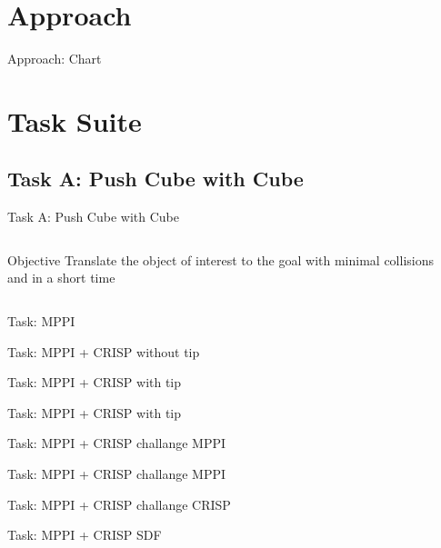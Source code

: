 \documentclass[10pt, aspectratio=169]{beamer}
\begin{document}
\section{Approach}
\begin{frame}{Approach: Chart}
\end{frame}

\section{Task Suite}
\subsection{Task A: Push Cube with Cube}
\begin{frame}{Task A: Push Cube with Cube}
  \begin{columns}[T]
    \begin{column}{0.6\textwidth}
      \begin{block}{Objective}
        Translate the object of interest to the goal with minimal collisions and in a short time
      \end{block}
    \end{column}

    \begin{column}{0.4\textwidth}
    \end{column}
  \end{columns}
\end{frame}
\begin{frame}{Task: MPPI}
\end{frame}
\begin{frame}{Task: MPPI + CRISP without tip}
\end{frame}
\begin{frame}{Task: MPPI + CRISP with tip}
\end{frame}
\begin{frame}{Task: MPPI + CRISP with tip}
\end{frame}
\begin{frame}{Task: MPPI + CRISP challange MPPI}
\end{frame}
\begin{frame}{Task: MPPI + CRISP challange MPPI}
\end{frame}
\begin{frame}{Task: MPPI + CRISP challange CRISP}
\end{frame}
\begin{frame}{Task: MPPI + CRISP SDF}
\end{frame}
\end{document}
